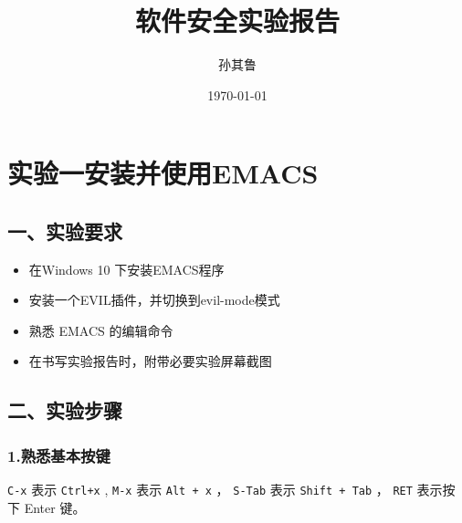 \documentclass[UTF8]{ctexart}
\author{孙其鲁}
\date{\today}
\title{软件安全实验报告}
\begin{document}
\maketitle

\section*{实验一安装并使用EMACS}
\label{sec:org7711d16}
\subsection*{一、实验要求}
\label{sec:org262c9d3}
\begin{itemize}
\item 在Windows 10 下安装EMACS程序
\item 安装一个EVIL插件，并切换到evil-mode模式
\item 熟悉 EMACS 的编辑命令
\item 在书写实验报告时，附带必要实验屏幕截图
\end{itemize}
\subsection*{二、实验步骤}
\label{sec:org7bd38d5}
\subsubsection*{1.熟悉基本按键}
\label{sec:orged5e056}
\texttt{C-x} 表示 \texttt{Ctrl+x} , \texttt{M-x} 表示 \texttt{Alt + x} ， \texttt{S-Tab} 表示 \texttt{Shift + Tab} ， \texttt{RET} 表示按下 Enter 键。
\end{document}
